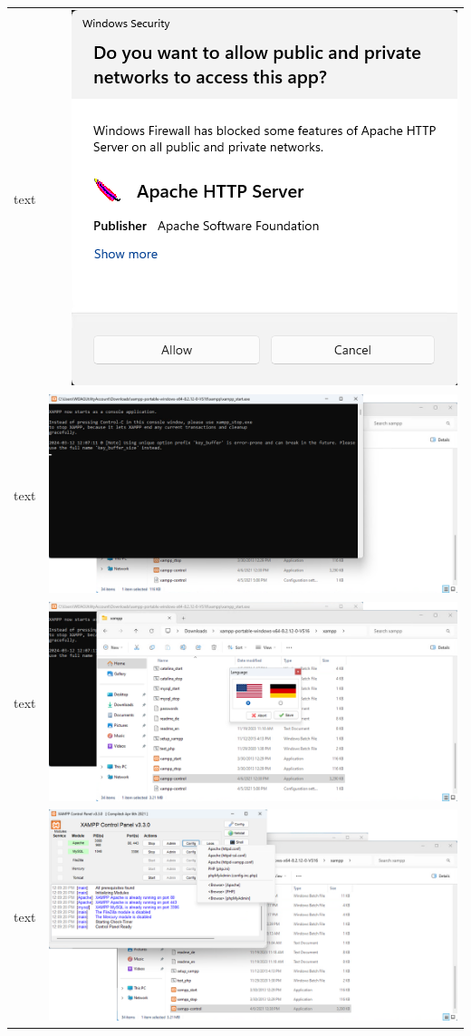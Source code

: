 \documentclass[11pt]{report}
\begin{document}
\begin{tabular}{ l r }
            text & \includegraphics[scale=1.0]{xampp12} \\
            text & \includegraphics[scale=1.0]{xampp13} \\
            text & \includegraphics[scale=1.0]{xampp14} \\
            text & \includegraphics[scale=1.0]{xampp15} \\

\end{tabular}
\end{document}
